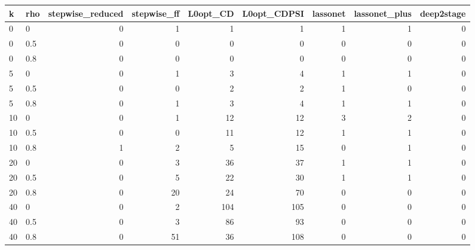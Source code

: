 \begin{tabular}{llrrrrrrr}
\toprule
k & rho & stepwise\_reduced & stepwise\_ff & L0opt\_CD & L0opt\_CDPSI & lassonet & lassonet\_plus & deep2stage \\
\midrule
0 & 0 & 0 & 1 & 1 & 1 & 1 & 1 & 0 \\
0 & 0.5 & 0 & 0 & 0 & 0 & 0 & 0 & 0 \\
0 & 0.8 & 0 & 0 & 0 & 0 & 0 & 0 & 0 \\
5 & 0 & 0 & 1 & 3 & 4 & 1 & 1 & 0 \\
5 & 0.5 & 0 & 0 & 2 & 2 & 1 & 0 & 0 \\
5 & 0.8 & 0 & 1 & 3 & 4 & 1 & 1 & 0 \\
10 & 0 & 0 & 1 & 12 & 12 & 3 & 2 & 0 \\
10 & 0.5 & 0 & 0 & 11 & 12 & 1 & 1 & 0 \\
10 & 0.8 & 1 & 2 & 5 & 15 & 0 & 1 & 0 \\
20 & 0 & 0 & 3 & 36 & 37 & 1 & 1 & 0 \\
20 & 0.5 & 0 & 5 & 22 & 30 & 1 & 1 & 0 \\
20 & 0.8 & 0 & 20 & 24 & 70 & 0 & 0 & 0 \\
40 & 0 & 0 & 2 & 104 & 105 & 0 & 0 & 0 \\
40 & 0.5 & 0 & 3 & 86 & 93 & 0 & 0 & 0 \\
40 & 0.8 & 0 & 51 & 36 & 108 & 0 & 0 & 0 \\
\bottomrule
\end{tabular}

